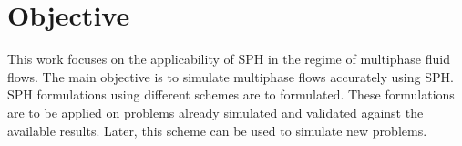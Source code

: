 \section{Objective}

This work focuses on the applicability of SPH in the regime of multiphase fluid flows. The main objective is to simulate multiphase
flows accurately using SPH. \\

SPH formulations using different schemes are to formulated. These formulations are to be applied on problems already simulated
and validated against the available results. Later, this scheme can be used to simulate new problems. 


